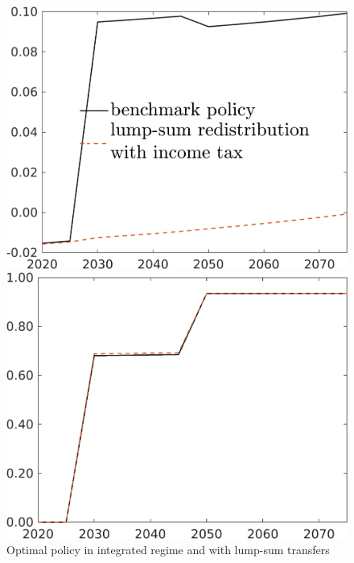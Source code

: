 \begin{figure}[h!!]
	\centering
	\caption{Optimal policy in integrated regime and with lump-sum transfers}\label{fig:bench_lumpsum_pol}
	
	\begin{minipage}[]{0.32\textwidth}
		\includegraphics[width=1\textwidth]{../../codding_model/own_basedOnFried/optimalPol_190722_tidiedUp/figures/all_July22/comp_bb3_notaul4_OPT_T_NoTaus_taul_spillover0_noskill0_sep1_xgrowth0_etaa0.79_lgd1.png}
	\end{minipage}
	\begin{minipage}[]{0.32\textwidth}
		\includegraphics[width=1\textwidth]{../../codding_model/own_basedOnFried/optimalPol_190722_tidiedUp/figures/all_July22/comp_bb3_notaul4_OPT_T_NoTaus_tauf_spillover0_noskill0_sep1_xgrowth0_etaa0.79_lgd0.png}

\end{minipage}
\end{figure}
